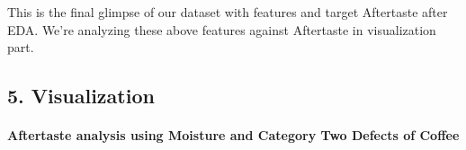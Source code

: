 \documentclass[11pt]{article}
\begin{document}
    This is the final glimpse of our dataset with features and target
Aftertaste after EDA. We're analyzing these above features against
Aftertaste in visualization part.

    \hypertarget{visualization}{%
\subsection{5. Visualization}\label{visualization}}

    \hypertarget{aftertaste-analysis-using-moisture-and-category-two-defects-of-coffee}{%
\paragraph{Aftertaste analysis using Moisture and Category Two Defects
of
Coffee}\label{aftertaste-analysis-using-moisture-and-category-two-defects-of-coffee}}
\end{document}
